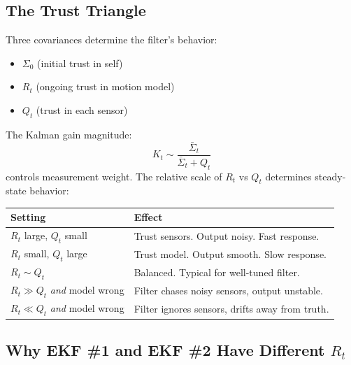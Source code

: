 \documentclass[11pt,a4paper]{article}
\begin{document}
\subsection{The Trust Triangle}

Three covariances determine the filter's behavior:
\begin{itemize}
\item $\Sigma_0$ (initial trust in self)
\item $R_t$ (ongoing trust in motion model)
\item $Q_t$ (trust in each sensor)
\end{itemize}

The Kalman gain magnitude:
\[
K_t \sim \frac{\bar{\Sigma}_t}{\bar{\Sigma}_t + Q_t}
\]
controls measurement weight. The relative scale of $R_t$ vs $Q_t$ determines steady-state behavior:

\begin{center}
\begin{tabular}{ll}
\toprule
\textbf{Setting} & \textbf{Effect} \\
\midrule
$R_t$ large, $Q_t$ small & Trust sensors. Output noisy. Fast response. \\
$R_t$ small, $Q_t$ large & Trust model. Output smooth. Slow response. \\
$R_t \sim Q_t$ & Balanced. Typical for well-tuned filter. \\
$R_t \gg Q_t$ \emph{and} model wrong & Filter chases noisy sensors, output unstable. \\
$R_t \ll Q_t$ \emph{and} model wrong & Filter ignores sensors, drifts away from truth. \\
\bottomrule
\end{tabular}
\end{center}

\subsection{Why EKF \#1 and EKF \#2 Have Different $R_t$}
\end{document}
